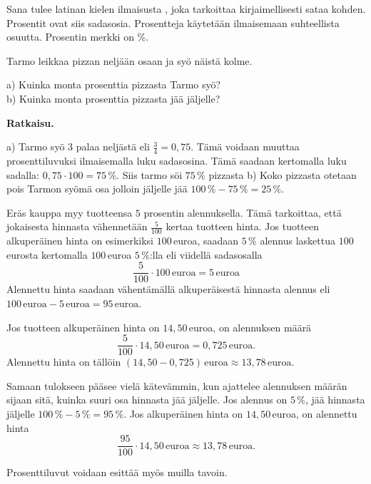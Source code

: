 Sana  tulee latinan kielen ilmaisusta ,
joka tarkoittaa kirjaimellisesti sataa kohden. 
Prosentit ovat siis sadasosia.
Prosentteja käytetään ilmaisemaan suhteellista osuutta.
Prosentin merkki on \%.


\begin{esimerkki}
Tarmo leikkaa pizzan neljään osaan ja syö näistä kolme.

a) Kuinka monta prosenttia pizzasta Tarmo syö? \\
b) Kuinka monta prosenttia pizzasta jää jäljelle?

\textbf{Ratkaisu.}

a) Tarmo syö 3 palaa neljästä eli $\frac{3}{4} = 0,75$. Tämä voidaan muuttaa prosenttiluvuksi ilmaisemalla luku sadasosina. Tämä saadaan kertomalla luku sadalla: $0,75 \cdot 100 = 75\,\%$. Siis tarmo söi $75\,\%$ pizzasta
\newline b) Koko pizzasta otetaan pois Tarmon syömä osa jolloin jäljelle jää $100\,\% - 75\,\% = 25\,\%$.
\end{esimerkki}


\begin{esimerkki}
Eräs kauppa myy tuotteensa $5$ prosentin alennuksella. Tämä tarkoittaa, että jokaisesta hinnasta vähennetään $\frac{5}{100}$ kertaa tuotteen hinta. Jos tuotteen alkuperäinen hinta on esimerkiksi $100$\,euroa, saadaan $5\,\%$ alennus laskettua $100$\,eurosta kertomalla $100$\,euroa $5\,\%$:lla eli viidellä sadasosalla 
\[
\frac{5}{100} \cdot 100\,\text{euroa} = 5\,\text{euroa}
\]
Alennettu hinta saadaan vähentämällä alkuperäisestä hinnasta alennus eli $100\,\text{euroa} - 5\,\text{euroa} = 95\,\text{euroa}$.

Jos tuotteen alkuperäinen hinta on $14,50$\,euroa, on alennuksen määrä
\[
	\frac{5}{100} \cdot 14,50\,\text{euroa} = 0,725\,\text{euroa}.
\]
Alennettu hinta on tällöin $(14,50 - 0,725)\,\text{euroa} \approx 13,78\,\text{euroa}$.

Samaan tulokseen pääsee vielä kätevämmin, kun ajattelee alennuksen määrän sijaan sitä, kuinka suuri osa hinnasta jää jäljelle. Jos alennus on $5\,\%$, jää hinnasta jäljelle $100\,\% - 5\,\% = 95\,\%$. Jos alkuperäinen hinta on $14,50$\,euroa, on alennettu hinta 
\[
	\frac{95}{100} \cdot 14,50\,\text{euroa} \approx 13,78\,\text{euroa}.
\]
\end{esimerkki}

\begin{esimerkki}
    Prosenttiluvut voidaan esittää myös muilla tavoin.
\end{esimerkki}

